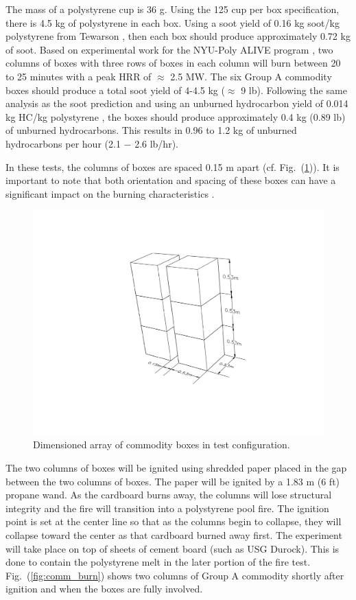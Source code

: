 \documentclass[12pt,oneside]{book}
\begin{document}
The mass of a polystyrene cup is 36 g. Using the 125 cup per box specification, there is 4.5 kg of polystyrene in each box. Using a soot yield of 0.16 kg soot/kg polystyrene from Tewarson \cite{SFPE:Tewarson}, then each box should produce approximately 0.72 kg of soot. Based on experimental work for the NYU-Poly ALIVE program \cite{Madrzykowski2013}, two columns of boxes with three rows of boxes in each column will burn between 20 to 25 minutes with a peak HRR of $\approx$ 2.5 MW. The six Group A commodity boxes should produce a total soot yield of 4-4.5 kg ($\approx$ 9 lb). Following the same analysis as the soot prediction and using an unburned hydrocarbon yield of 0.014 kg HC/kg polystyrene \cite{SFPE:Tewarson}, the boxes should produce approximately 0.4 kg (0.89 lb) of unburned hydrocarbons. This results in 0.96 to 1.2 kg of unburned hydrocarbons per hour (2.1 $-$ 2.6 lb/hr).

In these tests, the columns of boxes are spaced 0.15 m apart (cf. Fig.~(\ref{fig:dim_box})). It is important to note that both orientation and spacing of these boxes can have a significant impact on the burning characteristics \cite{Madrzykowski2013}.

\begin{figure}
\centering
\includegraphics[width=.7\textwidth]{../Figures/dim_box_array}
\caption {Dimensioned array of commodity boxes in test configuration.}
\label{fig:dim_box}
\end{figure}

The two columns of boxes will be ignited using shredded paper placed in the gap between the two columns of boxes. The paper will be ignited by a 1.83 m (6 ft) propane wand. As the cardboard burns away, the columns will lose structural integrity and the fire will transition into a polystyrene pool fire. The ignition point is set at the center line so that as the columns begin to collapse, they will collapse toward the center as that cardboard burned away first. The experiment will take place on top of sheets of cement board (such as USG Durock). This is done to contain the polystyrene melt in the later portion of the fire test. Fig.~(\ref{fig:comm_burn}) shows two columns of Group A commodity shortly after ignition and when the boxes are fully involved.
\end{document}
